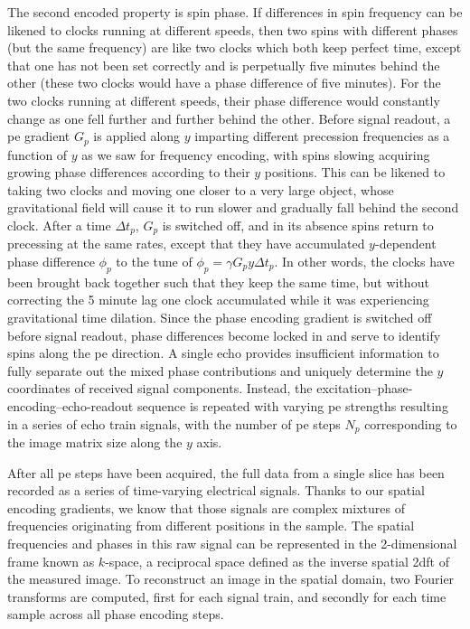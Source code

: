 The second encoded property is spin phase.
If differences in spin frequency can be likened to clocks running at different speeds, then two spins with different phases (but the same frequency) are like two clocks which both keep perfect time, except that one has not been set correctly and is perpetually five minutes behind the other (these two clocks would have a phase difference of five minutes).
For the two clocks running at different speeds, their phase difference would constantly change as one fell further and further behind the other.
Before signal readout, a \gls{pe} gradient $G_p$ is applied along $y$ imparting different precession frequencies as a function of $y$ as we saw for frequency encoding, with spins slowing acquiring growing phase differences according to their $y$ positions.
This can be likened to taking two clocks and moving one closer to a very large object, whose gravitational field will cause it to run slower and gradually fall behind the second clock.
After a time $\Delta t_p$, $G_p$ is switched off, and in its absence spins return to precessing at the same rates, except that they have accumulated $y$-dependent phase difference $\phi_p$ to the tune of $\phi_p=\gamma G_p y \Delta t_p$.
In other words, the clocks have been brought back together such that they keep the same time, but without correcting the 5 minute lag one clock accumulated while it was experiencing gravitational time dilation.
Since the phase encoding gradient is switched off before signal readout, phase differences become locked in and serve to identify spins along the \gls{pe} direction.
A single echo provides insufficient information to fully separate out the mixed phase contributions and uniquely determine the $y$ coordinates of received signal components.
Instead, the excitation--phase-encoding--echo-readout sequence is repeated with varying \gls{pe} strengths resulting in a series of echo train signals, with the number of \gls{pe} steps $N_{p}$ corresponding to the image matrix size along the $y$ axis.

After all \gls{pe} steps have been acquired, the full data from a single slice has been recorded as a series of time-varying electrical signals.
Thanks to our spatial encoding gradients, we know that those signals are complex mixtures of frequencies originating from different positions in the sample.
The spatial frequencies and phases in this raw signal can be represented in the 2-dimensional frame known as $k$-space, a reciprocal space defined as the inverse spatial \gls{2dft} of the measured image.
To reconstruct an image in the spatial domain, two Fourier transforms are computed, first for each signal train, and secondly for each time sample across all phase encoding steps.

